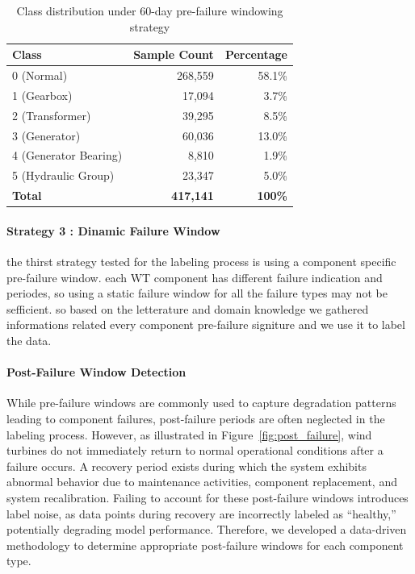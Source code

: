\documentclass[12pt]{article}
\begin{document}
\begin{table}[htbp]
\centering
\caption{Class distribution under 60-day pre-failure windowing strategy}
\label{tab:class_dist_60d}
\begin{tabular}{lrr}
\toprule
\textbf{Class} & \textbf{Sample Count} & \textbf{Percentage} \\
\midrule
0 (Normal) & 268,559 & 58.1\% \\
1 (Gearbox) & 17,094 & 3.7\% \\
2 (Transformer) & 39,295 & 8.5\% \\
3 (Generator) & 60,036 & 13.0\% \\
4 (Generator Bearing) & 8,810 & 1.9\% \\
5 (Hydraulic Group) & 23,347 & 5.0\% \\
\midrule
\textbf{Total} & \textbf{417,141} & \textbf{100\%} \\
\bottomrule
\end{tabular}
\end{table}

\paragraph{Strategy 3 : Dinamic Failure Window}
the thirst strategy tested for the labeling process is using a component specific pre-failure window. each WT component has different failure indication and periodes, so using a static failure window for all the failure types may not be sefficient. so based on the letterature and domain knowledge we gathered informations related every component pre-failure signiture and we use it to label the data. 

\paragraph{Post-Failure Window Detection}

While pre-failure windows are commonly used to capture degradation patterns leading to component failures, post-failure periods are often neglected in the labeling process. However, as illustrated in Figure~\ref{fig:post_failure}, wind turbines do not immediately return to normal operational conditions after a failure occurs. A recovery period exists during which the system exhibits abnormal behavior due to maintenance activities, component replacement, and system recalibration. Failing to account for these post-failure windows introduces label noise, as data points during recovery are incorrectly labeled as ``healthy,'' potentially degrading model performance. Therefore, we developed a data-driven methodology to determine appropriate post-failure windows for each component type.
\end{document}
